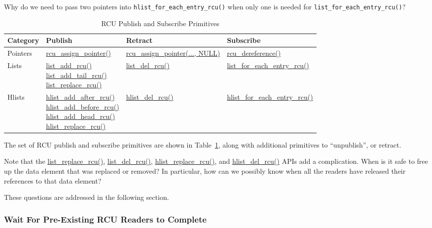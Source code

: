 \QuickQuiz{}
	Why do we need to pass two pointers into
	{\tt hlist\_for\_each\_entry\_rcu()}
	when only one is needed for {\tt list\_for\_each\_entry\_rcu()}?
 \QuickQuizEnd

\begin{table}[tb]
\begin{center}
\scriptsize
\begin{tabular}{l||l|l|l}
Category  & Publish	& Retract	& Subscribe \\
\hline
\hline
Pointers  & \url{rcu_assign_pointer()}
			& \url{rcu_assign_pointer(..., NULL)}
					& \url{rcu_dereference()} \\
\hline
Lists     & \parbox{1.5in}{
		\url{list_add_rcu()} \\
		\url{list_add_tail_rcu()} \\
		\url{list_replace_rcu()} }
			& \url{list_del_rcu()}
					& \url{list_for_each_entry_rcu()} \\
\hline
Hlists    & \parbox{1.5in}{
		\url{hlist_add_after_rcu()} \\
		\url{hlist_add_before_rcu()}  \\
		\url{hlist_add_head_rcu()} \\
		\url{hlist_replace_rcu()} }
			& \url{hlist_del_rcu()}
					& \url{hlist_for_each_entry_rcu()}
\end{tabular}
\end{center}
\caption{RCU Publish and Subscribe Primitives}
\label{tab:defer:RCU Publish and Subscribe Primitives}
\end{table}

The set of RCU publish and subscribe primitives are shown in
Table~\ref{tab:defer:RCU Publish and Subscribe Primitives},
along with additional primitives to ``unpublish'', or retract.

Note that the \url{list_replace_rcu()}, \url{list_del_rcu()},
\url{hlist_replace_rcu()}, and \url{hlist_del_rcu()}
APIs add a complication.
When is it safe to free up the data element that was replaced or
removed?
In particular, how can we possibly know when all the readers
have released their references to that data element?

These questions are addressed in the following section.

\subsubsection{Wait For Pre-Existing RCU Readers to Complete}
\label{sec:defer:Wait For Pre-Existing RCU Readers to Complete}

